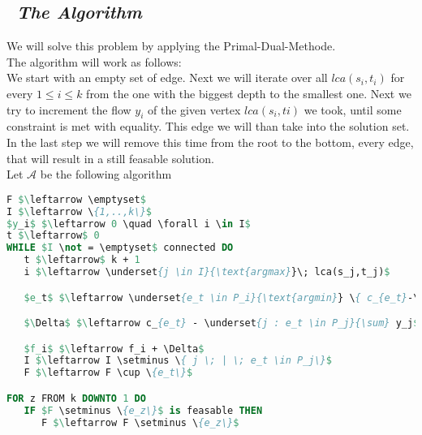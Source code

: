 \subsection*{\itshape~The Algorithm}

We will solve this problem by applying the Primal-Dual-Methode.\\

The algorithm will work as follows:\\
We start with an empty set of edge. Next we will iterate over all $lca(s_i,t_i)$ for every $1 \leq i \leq k$
from the one with the biggest depth to the smallest one. Next we try to increment the flow $y_i$
of the given vertex $lca(s_i,ti)$ we took, until some constraint is met with equality. This edge
we will than take into the solution set. In the last step we will remove this time from the root to the
bottom, every edge, that will result in a still feasable solution.\\

Let $\mathcal{A}$ be the following algorithm\\

\begin{lstlisting}[language=Pascal]
F $\leftarrow \emptyset$
I $\leftarrow \{1,..,k\}$
$y_i$ $\leftarrow 0 \quad \forall i \in I$
t $\leftarrow$ 0
WHILE $I \not = \emptyset$ connected DO
   t $\leftarrow$ k + 1
   i $\leftarrow \underset{j \in I}{\text{argmax}}\; lca(s_j,t_j)$

   $e_t$ $\leftarrow \underset{e_t \in P_i}{\text{argmin}} \{ c_{e_t}-\underset{j:e_t\in P_j}{\sum} y_j\}$

   $\Delta$ $\leftarrow c_{e_t} - \underset{j : e_t \in P_j}{\sum} y_j$

   $f_i$ $\leftarrow f_i + \Delta$
   I $\leftarrow I \setminus \{ j \; | \; e_t \in P_j\}$
   F $\leftarrow F \cup \{e_t\}$

FOR z FROM k DOWNTO 1 DO
   IF $F \setminus \{e_z\}$ is feasable THEN
      F $\leftarrow F \setminus \{e_z\}$
\end{lstlisting}
